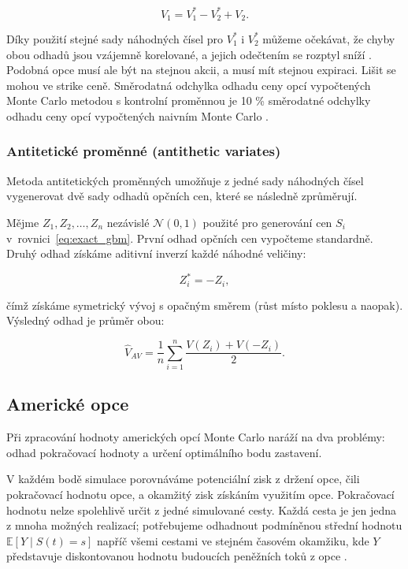 \documentclass[male,czech,api_bc]{kitheses}
\begin{document}
  \begin{equation}
    V_1 = V_1^* - V_2^* + V_2.
  \end{equation}

  Díky použití stejné sady náhodných čísel pro $V_1^*$ i $V_2^*$ můžeme očekávat, že chyby obou odhadů jsou vzájemně korelované, a jejich odečtením se rozptyl sníží \parencites[kapitola~80.13.2]{Wilmott2006}. Podobná opce musí ale být na stejnou akcii, a musí mít stejnou expiraci. Lišit se mohou ve strike ceně. Směrodatná odchylka odhadu ceny opcí vypočtených Monte Carlo metodou s kontrolní proměnnou je 10 \% směrodatné odchylky odhadu ceny opcí vypočtených naivním Monte Carlo \parencites[kapitola~24.5]{McDonald2013}.

  \subsubsection{Antitetické proměnné (antithetic variates)}

  Metoda antitetických proměnných umožňuje z jedné sady náhodných čísel vygenerovat dvě sady odhadů opčních cen, které se následně zprůměrují.

  Mějme $Z_1, Z_2, \dots, Z_n$ nezávislé $\mathcal{N}(0,1)$ použité pro generování cen $S_i$ v~rovnici~\eqref{eq:exact_gbm}. První odhad opčních cen vypočteme standardně. Druhý odhad získáme aditivní inverzí každé náhodné veličiny:

  \begin{equation}
    Z_i^* = -Z_i,
  \end{equation}

  čímž získáme symetrický vývoj s opačným směrem (růst místo poklesu a naopak). Výsledný odhad je průměr obou:

  \begin{equation}
    \hat{V}_{AV} = \frac{1}{n} \sum_{i=1}^n \frac{V(Z_i) + V(-Z_i)}{2}.
  \end{equation}

  \parencites[kapitola~24.5]{McDonald2013}[kapitola~4.2]{Glasserman2004} 

  \subsection{Americké opce}

  Při zpracování hodnoty amerických opcí Monte Carlo naráží na dva problémy: odhad pokračovací hodnoty a určení optimálního bodu zastavení.

  V každém bodě simulace porovnáváme potenciální zisk z držení opce, čili pokračovací hodnotu opce, a okamžitý zisk získáním využitím opce. Pokračovací hodnotu nelze spolehlivě určit z jedné simulované cesty. Každá cesta je jen jedna z mnoha možných realizací; potřebujeme odhadnout podmíněnou střední hodnotu \(\mathbb{E}[Y \mid S(t) = s]\) napříč všemi cestami ve stejném časovém okamžiku, kde $Y$ představuje diskontovanou hodnotu budoucích peněžních toků z opce \parencites[kapitola~24.6]{McDonald2013}.
\end{document}

